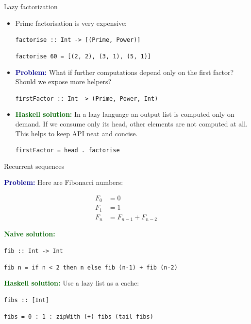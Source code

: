 \documentclass[handout]{beamer}
\def\problem{\textcolor{darkblue}{\bf Problem:} }
\def\solution{\textcolor{darkgreen}{\bf Haskell solution:} }
\begin{document}
\begin{frame}{Lazy factorization}

\begin{itemize}[<+->]

\item Prime factorisation is very expensive:

  \smallskip

{\tt factorise :: Int -> [(Prime, Power)] } \par
{\tt factorise 60 = [(2, 2), (3, 1), (5, 1)] } \par

\item
\problem
What if further computations depend only on the first factor?
Should we expose more helpers?

  \smallskip

{\tt firstFactor :: Int -> (Prime, Power, Int)}

\item
\solution
  In a lazy language an output list is computed only on demand.
  If we consume only its head, other elements are not computed at all.
  This helps to keep API neat and concise.

  \smallskip

  {\tt firstFactor = head . factorise }

\end{itemize}

\end{frame}


\begin{frame}{Recurrent sequences}

\problem Here are Fibonacci numbers:

\vspace{-3ex}

  \begin{align*}
  F_0 &= 0  \\
  F_1 &= 1  \\
  F_n &= F_{n-1} + F_{n-2}
  \end{align*}

\pause

\textcolor{darkgreen}{\bf Naive solution:}

\medskip

  {\tt fib :: Int -> Int } \par
  {\tt fib n = if n < 2 then n else fib (n-1) + fib (n-2) }

\medskip

\pause

\solution Use a lazy list as a cache:

\medskip

  {\tt fibs :: [Int]} \par
  {\tt fibs = 0 : 1 : zipWith (+) fibs (tail fibs) }

\end{frame}
\end{document}
